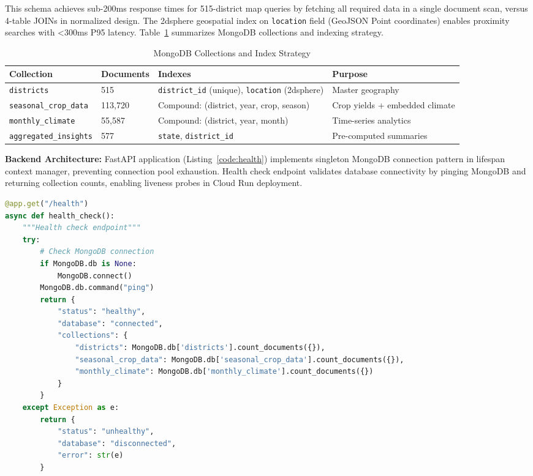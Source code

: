 \documentclass[10pt,a4paper]{article}
\begin{document}
This schema achieves sub-200ms response times for 515-district map queries by fetching all required data in a single document scan, versus 4-table JOINs in normalized design. The 2dsphere geospatial index on \texttt{location} field (GeoJSON Point coordinates) enables proximity searches with <300ms P95 latency. Table~\ref{tab:mongo} summarizes MongoDB collections and indexing strategy.

\begin{table}[h]
\centering
\caption{MongoDB Collections and Index Strategy}
\small
\begin{tabular}{@{}llll@{}}
\toprule
\textbf{Collection} & \textbf{Documents} & \textbf{Indexes} & \textbf{Purpose} \\
\midrule
\texttt{districts} & 515 & \texttt{district\_id} (unique), \texttt{location} (2dsphere) & Master geography \\
\texttt{seasonal\_crop\_data} & 113,720 & Compound: (district, year, crop, season) & Crop yields + embedded climate \\
\texttt{monthly\_climate} & 55,587 & Compound: (district, year, month) & Time-series analytics \\
\texttt{aggregated\_insights} & 577 & \texttt{state}, \texttt{district\_id} & Pre-computed summaries \\
\bottomrule
\end{tabular}
\label{tab:mongo}
\end{table}

\textbf{Backend Architecture:}
FastAPI application (Listing~\ref{code:health}) implements singleton MongoDB connection pattern in lifespan context manager, preventing connection pool exhaustion. Health check endpoint validates database connectivity by pinging MongoDB and returning collection counts, enabling liveness probes in Cloud Run deployment.

\begin{lstlisting}[caption={FastAPI health check with MongoDB validation (main.py lines 67-89)},label=code:health,language=Python]
@app.get("/health")
async def health_check():
    """Health check endpoint"""
    try:
        # Check MongoDB connection
        if MongoDB.db is None:
            MongoDB.connect()
        MongoDB.db.command("ping")
        return {
            "status": "healthy",
            "database": "connected",
            "collections": {
                "districts": MongoDB.db['districts'].count_documents({}),
                "seasonal_crop_data": MongoDB.db['seasonal_crop_data'].count_documents({}),
                "monthly_climate": MongoDB.db['monthly_climate'].count_documents({})
            }
        }
    except Exception as e:
        return {
            "status": "unhealthy",
            "database": "disconnected",
            "error": str(e)
        }
\end{lstlisting}
\end{document}
